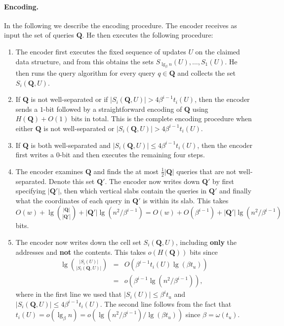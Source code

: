 \documentclass[letterpaper]{article}
\newcommand{\Q}{\textbf{Q}}
\begin{document}
\paragraph{Encoding.}
In the following we describe the encoding procedure. The encoder
receives as input the set of queries $\Q$. He then executes the
following procedure:
\begin{enumerate}
\item The encoder first executes the fixed sequence of updates $U$ on
  the claimed data structure, and from this obtains the sets
  $S_{\lg_\beta n}(U),\dots,S_1(U)$. He then runs the query algorithm
  for every query $q \in \Q$ and collects the set $S_i(\Q,U)$.
\item If $\Q$ is not well-separated or if $|S_i(\Q,U)|>4\beta^{i-1}
  t_i(U)$, then the encoder sends a $1$-bit followed by a
  straightforward encoding of $\Q$ using $H(\Q)+O(1)$ bits in
  total. This is the complete encoding procedure when either $\Q$ is
  not well-separated or $|S_i(\Q,U)|>4\beta^{i-1} t_i(U)$.

\item If $\Q$ is both well-separated and $|S_i(\Q,U)|\leq 4
  \beta^{i-1}t_i(U)$, then the encoder first writes a
  $0$-bit and then executes the remaining four steps.

\item The encoder examines $\Q$ and finds the at most $\tfrac{1}{2}|\Q|$
  queries that are not well-separated. Denote this set $\Q'$. The
  encoder now writes down $\Q'$ by first specifying $|\Q'|$, then
  which vertical slabs contain the queries in $\Q'$ and finally what
  the coordinates of each query in $\Q'$ is within its slab. This
  takes
  $O(w)+\lg\binom{|\Q|}{|\Q'|}+|\Q'|\lg(n^2/\beta^{i-1})=O(w)+O(\beta^{i-1})+|\Q'|\lg(n^2/\beta^{i-1})$
  bits.

\item The encoder now writes down the cell set $S_i(\Q,U)$, including
  \textbf{only} the addresses and \textbf{not} the contents. This
  takes $o(H(\Q))$ bits since 
\begin{eqnarray*}
\lg \binom{|S_i(U)|}{|S_i(\Q,U)|} &=& O(\beta^{i-1} t_i(U) \lg(\beta t_u))\\&=&o(\beta^{i-1}
  \lg(n^2/\beta^{i-1})),
\end{eqnarray*}
where in the first line we used that $|S_i(U)|\leq \beta^it_u$ and $|S_i(\Q,U)| \leq 4\beta^{i-1} t_i(U)$. The second line follows from the fact that
  $t_i(U)=o(\lg_\beta n)=o(\lg (n^2/\beta^{i-1})/\lg(\beta
  t_u))$ since $\beta = \omega(t_u)$.


\end{enumerate}
\end{document}
